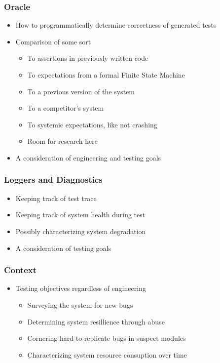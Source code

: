 \begin{frame}
  \frametitle{Oracle}
  \begin{itemize}
    \item How to programmatically determine correctness of generated tests
    \item Comparison of some sort
    \begin{itemize}
      \item To assertions in previously written code
      \item To expectations from a formal Finite State Machine
      \item To a previous version of the system
      \item To a competitor's system
      \item To systemic expectations, like not crashing
      \item Room for research here
    \end{itemize}
    \item A consideration of engineering and testing goals
  \end{itemize}
\end{frame}

\begin{frame}
  \frametitle{Loggers and Diagnostics}
  \begin{itemize}
    \item Keeping track of test trace
    \item Keeping track of system health during test
    \item Possibly characterizing system degradation
    \item A consideration of testing goals
  \end{itemize}
\end{frame}

\begin{frame}
  \frametitle{Context}
  \begin{itemize}
    \item Testing objectives regardless of engineering
    \begin{itemize}
      \item Surveying the system for new bugs
      \item Determining system resillience through abuse
      \item Cornering hard-to-replicate bugs in suspect modules
      \item Characterizing system resource consuption over time
    \end{itemize}
  \end{itemize}
\end{frame}

